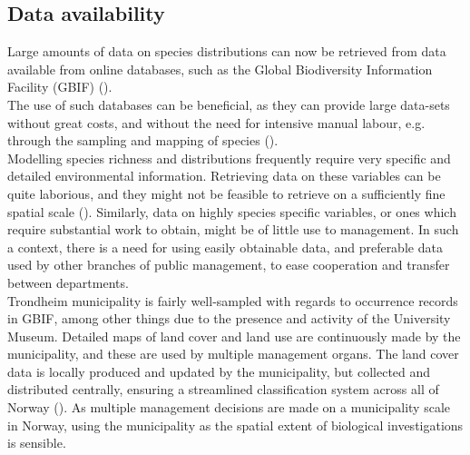 \documentclass{article}
\begin{document}
\subsection{Data availability}
Large amounts of data on species distributions can now be retrieved from data available from online databases, such as the Global Biodiversity Information Facility (GBIF) (\cite{GBIF}). \\ 
The use of such databases can be beneficial, as they can provide large data-sets without great costs, and without the need for intensive manual labour, e.g. through the sampling and mapping of species (\cite{Graham2004}).\\
Modelling species richness and distributions frequently require very specific and detailed environmental information. Retrieving data on these variables can be quite laborious, and they might not be feasible to retrieve on a sufficiently fine spatial scale  (\cite{Guisan2000}). 
Similarly, data on highly species specific variables, or ones which require substantial work to obtain, might be of little use to management. In such a context, there is a need for using easily obtainable data, and preferable data used by other branches of public management, to ease cooperation and transfer between departments.\\

Trondheim municipality is fairly well-sampled with regards to occurrence records in GBIF, among other things due to the presence and activity of the University Museum.
Detailed maps of land cover and land use are continuously made by the municipality, and these are used by multiple management organs. The land cover data is locally produced and updated by the municipality, but collected and distributed centrally, ensuring a streamlined classification system across all of Norway (\cite{SOSI}). 
As multiple management decisions are made on a municipality scale in Norway, using the municipality as the spatial extent of biological investigations is sensible.\\ %
\end{document}
